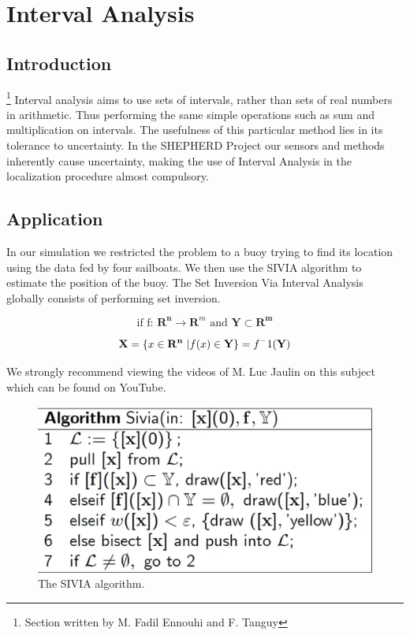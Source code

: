 \documentclass[a4paper]{report}
\begin{document}
% 
\section{Interval Analysis}
\subsection{Introduction}
\footnote{Section written by M. Fadil Ennouhi and F. Tanguy} 
Interval analysis aims to use sets of intervals, rather than
sets of real numbers in arithmetic. 
Thus performing the same simple operations such as sum and multiplication on intervals. The usefulness of this particular method lies in its tolerance to uncertainty. In the SHEPHERD Project our sensors and methods inherently cause uncertainty, making the use of Interval Analysis in the localization procedure almost compulsory.

\subsection{Application}
In our simulation we restricted the problem to a buoy trying to find its location using the data fed by four sailboats. We then use the SIVIA algorithm to estimate the position of the buoy. 
The Set Inversion Via Interval Analysis globally consists of performing set inversion. 

\begin{equation}
	\text{if f: } \mathbf{R^n} \rightarrow \mathbf{R}^m \text{ and } \mathbf{Y} \subset \mathbf{R^m}
\end{equation}

\begin{equation}
	\mathbf{X}=\{x \in \mathbf{R^n}\ | f(x) \in \mathbf{Y} \}=f^-1\mathbf{(Y)} \nonumber\\
	\label{eq: Set Inversion}
\end{equation}

We strongly recommend viewing the videos of M. Luc Jaulin on this subject which can be found on YouTube.

\begin{figure}[H]
	\centering
	\includegraphics[width=0.4\linewidth]{image/sivia.png}
	\caption{The SIVIA algorithm.}
	\label{fig:SIVIA}
\end{figure}
\end{document}
